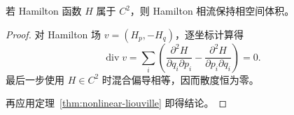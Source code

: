 \begin{corollary}[Hamilton相流保持体积]\label{cor:hamilton-volume}
若 Hamilton 函数 $H$ 属于 $C^2$，则 Hamilton 相流保持相空间体积。
\end{corollary}
\begin{proof}
对 Hamilton 场 $v=(H_p,-H_q)$，逐坐标计算得
\[
 \operatorname{div}v
 =\sum_i\left(\frac{\partial^2H}{\partial q_i\partial p_i}
 -\frac{\partial^2H}{\partial p_i\partial q_i}\right)=0.
\]
最后一步使用 $H\in C^2$ 时混合偏导相等，因而散度恒为零。

再应用定理~\ref{thm:nonlinear-liouville} 即得结论。
\end{proof}
